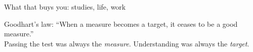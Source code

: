 \documentclass[10pt]{beamer}
\begin{document}
\begin{frame}{What that buys you: studies, life, work}

\pause
\vfill
{\footnotesize\centering
\alert{Goodhart's law}: ``When a measure becomes a target, it ceases to be a good measure.'' \\
Passing the test was always the \emph{measure}. Understanding was always the \emph{target}.\par}

\end{frame}
 


%
%
\end{document}
